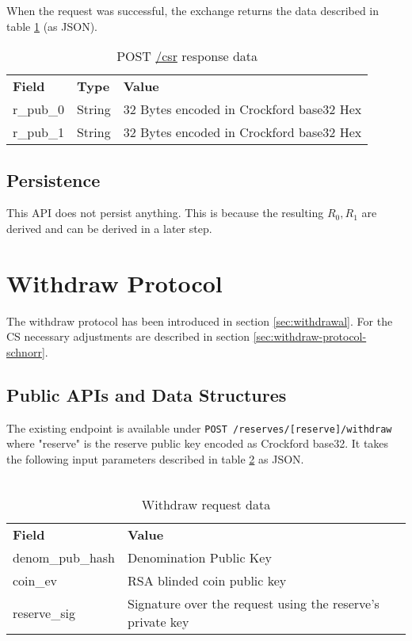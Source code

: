 When the request was successful, the exchange returns the data described in table \ref{tab:csr-response-data} (as \ac{JSON}).
\begin{table}[ht]
  \centering
  \setupBfhTabular
  \begin{tabular}{lll}
      \rowcolor{BFH-tablehead}
      \textbf{Field} & \textbf{Type} & \textbf{Value} \\
      r\_pub\_0 & String & 32 Bytes encoded in Crockford base32 Hex \\
      r\_pub\_1 & String & 32 Bytes encoded in Crockford base32 Hex \\
  \end{tabular}
  \caption{POST \url{/csr} response data}
  \label{tab:csr-response-data}
\end{table}


\subsection{Persistence}
This API does not persist anything.
This is because the resulting $R_0, R_1$ are derived and can be derived in a later step.


\section{Withdraw Protocol}
\label{sec:specification-withdraw}
The withdraw protocol has been introduced in section \ref{sec:withdrawal}.
For the \acl{CS} necessary adjustments are described in section \ref{sec:withdraw-protocol-schnorr}.


\subsection{Public APIs and Data Structures}
\label{sec:specification-withdraw-public-api}
The existing endpoint is available under \texttt{POST /reserves/[reserve]/withdraw} where "reserve" is the reserve public key encoded as Crockford base32.
It takes the following input parameters described in table \ref{tab:withdraw-request-data} as JSON.\\\\
\begin{table}[ht]
  \centering
  \setupBfhTabular
  \begin{tabular}{ll}
      \rowcolor{BFH-tablehead}
      \textbf{Field} & \textbf{Value} \\
      denom\_pub\_hash & Denomination Public Key \\
      coin\_ev & RSA blinded coin public key \\
      reserve\_sig & Signature over the request using the reserve's private key \\
  \end{tabular}
  \caption{Withdraw request data}
  \label{tab:withdraw-request-data}
\end{table}

